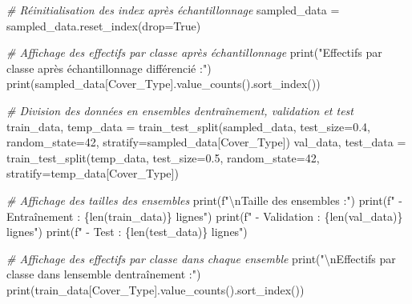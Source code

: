 \documentclass[
  letterpaper,
  DIV=11,
  numbers=noendperiod]{scrartcl}
\newenvironment{Shaded}{}{}
\newcommand{\BuiltInTok}[1]{\textcolor[rgb]{0.00,0.50,0.00}{#1}}
\newcommand{\CharTok}[1]{\textcolor[rgb]{0.25,0.44,0.63}{#1}}
\newcommand{\CommentTok}[1]{\textcolor[rgb]{0.38,0.63,0.69}{\textit{#1}}}
\newcommand{\DecValTok}[1]{\textcolor[rgb]{0.25,0.63,0.44}{#1}}
\newcommand{\FloatTok}[1]{\textcolor[rgb]{0.25,0.63,0.44}{#1}}
\newcommand{\NormalTok}[1]{#1}
\newcommand{\OperatorTok}[1]{\textcolor[rgb]{0.40,0.40,0.40}{#1}}
\newcommand{\SpecialCharTok}[1]{\textcolor[rgb]{0.25,0.44,0.63}{#1}}
\newcommand{\SpecialStringTok}[1]{\textcolor[rgb]{0.73,0.40,0.53}{#1}}
\newcommand{\StringTok}[1]{\textcolor[rgb]{0.25,0.44,0.63}{#1}}
\newcommand{\VariableTok}[1]{\textcolor[rgb]{0.10,0.09,0.49}{#1}}
\begin{document}
\begin{Shaded}
\begin{Highlighting}[]
\CommentTok{\# Réinitialisation des index après échantillonnage}
\NormalTok{sampled\_data }\OperatorTok{=}\NormalTok{ sampled\_data.reset\_index(drop}\OperatorTok{=}\VariableTok{True}\NormalTok{)}

\CommentTok{\# Affichage des effectifs par classe après échantillonnage}
\BuiltInTok{print}\NormalTok{(}\StringTok{"Effectifs par classe après échantillonnage différencié :"}\NormalTok{)}
\BuiltInTok{print}\NormalTok{(sampled\_data[}\StringTok{\textquotesingle{}Cover\_Type\textquotesingle{}}\NormalTok{].value\_counts().sort\_index())}

\CommentTok{\# Division des données en ensembles d\textquotesingle{}entraînement, validation et test}
\NormalTok{train\_data, temp\_data }\OperatorTok{=}\NormalTok{ train\_test\_split(sampled\_data, test\_size}\OperatorTok{=}\FloatTok{0.4}\NormalTok{, random\_state}\OperatorTok{=}\DecValTok{42}\NormalTok{, stratify}\OperatorTok{=}\NormalTok{sampled\_data[}\StringTok{\textquotesingle{}Cover\_Type\textquotesingle{}}\NormalTok{])}
\NormalTok{val\_data, test\_data }\OperatorTok{=}\NormalTok{ train\_test\_split(temp\_data, test\_size}\OperatorTok{=}\FloatTok{0.5}\NormalTok{, random\_state}\OperatorTok{=}\DecValTok{42}\NormalTok{, stratify}\OperatorTok{=}\NormalTok{temp\_data[}\StringTok{\textquotesingle{}Cover\_Type\textquotesingle{}}\NormalTok{])}

\CommentTok{\# Affichage des tailles des ensembles}
\BuiltInTok{print}\NormalTok{(}\SpecialStringTok{f"}\CharTok{\textbackslash{}n}\SpecialStringTok{Taille des ensembles :"}\NormalTok{)}
\BuiltInTok{print}\NormalTok{(}\SpecialStringTok{f"  {-} Entraînement : }\SpecialCharTok{\{}\BuiltInTok{len}\NormalTok{(train\_data)}\SpecialCharTok{\}}\SpecialStringTok{ lignes"}\NormalTok{)}
\BuiltInTok{print}\NormalTok{(}\SpecialStringTok{f"  {-} Validation : }\SpecialCharTok{\{}\BuiltInTok{len}\NormalTok{(val\_data)}\SpecialCharTok{\}}\SpecialStringTok{ lignes"}\NormalTok{)}
\BuiltInTok{print}\NormalTok{(}\SpecialStringTok{f"  {-} Test : }\SpecialCharTok{\{}\BuiltInTok{len}\NormalTok{(test\_data)}\SpecialCharTok{\}}\SpecialStringTok{ lignes"}\NormalTok{)}

\CommentTok{\# Affichage des effectifs par classe dans chaque ensemble}
\BuiltInTok{print}\NormalTok{(}\StringTok{"}\CharTok{\textbackslash{}n}\StringTok{Effectifs par classe dans l\textquotesingle{}ensemble d\textquotesingle{}entraînement :"}\NormalTok{)}
\BuiltInTok{print}\NormalTok{(train\_data[}\StringTok{\textquotesingle{}Cover\_Type\textquotesingle{}}\NormalTok{].value\_counts().sort\_index())}


\end{Highlighting}
\end{Shaded}
\end{document}
